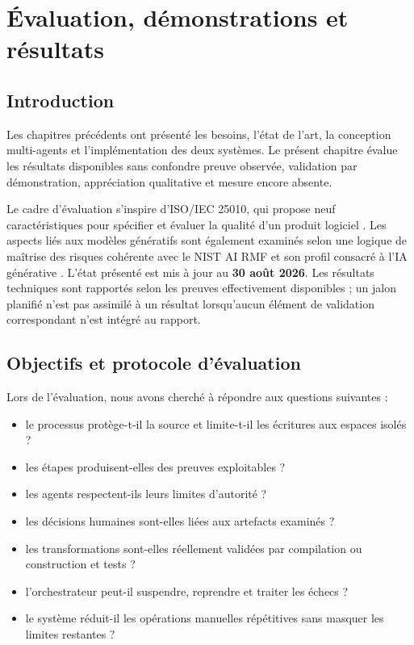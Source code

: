 \chapter{Évaluation, démonstrations et résultats}

\section*{Introduction}

Les chapitres précédents ont présenté les besoins, l'état de l'art, la conception multi-agents et l'implémentation des deux systèmes. Le présent chapitre évalue les résultats disponibles sans confondre preuve observée, validation par démonstration, appréciation qualitative et mesure encore absente.

Le cadre d'évaluation s'inspire d'ISO/IEC 25010, qui propose neuf caractéristiques pour spécifier et évaluer la qualité d'un produit logiciel \cite{iso25010}. Les aspects liés aux modèles génératifs sont également examinés selon une logique de maîtrise des risques cohérente avec le NIST AI RMF et son profil consacré à l'IA générative \cite{nist-airmf,nist-genai}. L'état présenté est mis à jour au \textbf{30 août 2026}. Les résultats techniques sont rapportés selon les preuves effectivement disponibles ; un jalon planifié n'est pas assimilé à un résultat lorsqu'aucun élément de validation correspondant n'est intégré au rapport.

\section{Objectifs et protocole d'évaluation}

Lors de l'évaluation, nous avons cherché à répondre aux questions suivantes :

\begin{itemize}
    \item le processus protège-t-il la source et limite-t-il les écritures aux espaces isolés ?
    \item les étapes produisent-elles des preuves exploitables ?
    \item les agents respectent-ils leurs limites d'autorité ?
    \item les décisions humaines sont-elles liées aux artefacts examinés ?
    \item les transformations sont-elles réellement validées par compilation ou construction et tests ?
    \item l'orchestrateur peut-il suspendre, reprendre et traiter les échecs ?
    \item le système réduit-il les opérations manuelles répétitives sans masquer les limites restantes ?
\end{itemize}

